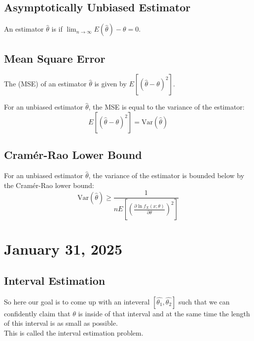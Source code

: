 \documentclass[11pt]{article}
\begin{document}
\subsection{Asymptotically Unbiased Estimator}
\begin{definition}
	An estimator $\hat{\theta}$ is  if $\lim_{n \to \infty} E(\hat{\theta}) - \theta = 0$.
\end{definition}

\subsection{Mean Square Error}
\begin{definition}
	The  (MSE) of an estimator $\hat{\theta}$ is given by $E[(\hat{\theta} - \theta)^2]$.
\end{definition}

For an unbiased estimator $\hat{\theta}$, the MSE is equal to the variance of the estimator:
\[ E[(\hat{\theta} - \theta)^2] = \text{Var}(\hat{\theta}) \]

\subsection{Cramér-Rao Lower Bound}
\begin{theorem}
	For an unbiased estimator $\hat{\theta}$, the variance of the estimator is bounded below by the Cramér-Rao lower bound:
	\[ \text{Var}(\hat{\theta}) \geq \frac{1}{n E\left[\left(\frac{\partial \ln f_X(x; \theta)}{\partial \theta}\right)^2\right]} \]
\end{theorem}
\section{January 31, 2025}
\subsection{Interval Estimation}
So here our goal is to come up with an inteveral \([\hat{\theta_1}, \hat{\theta_2}]\) such that we can confidently claim that \(\theta\) is inside of that interval and at the same time the length of this interval is as small as possible. \\
This is called the interval estimation problem.
\end{document}
